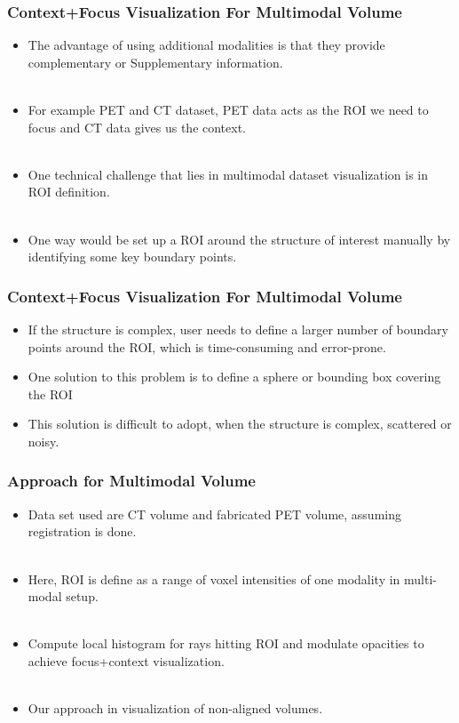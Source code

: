 \documentclass{beamer}
\begin{document}


\begin{frame}
\frametitle{Context+Focus Visualization For Multimodal Volume}
\begin{itemize}
\item The advantage of using additional modalities is that they provide complementary or Supplementary information. \\ $ $
\item For example PET and CT dataset, PET data acts as the ROI we need to focus and CT data gives us the context. \\ $ $
\item One technical challenge that lies in multimodal dataset visualization is in ROI definition.  \\ $ $
\item One way would be set up a ROI around the structure of interest manually by identifying some key boundary points.
\end{itemize}
\end{frame}



\begin{frame}
\frametitle{Context+Focus Visualization For Multimodal Volume}
\begin{itemize}
 
\item If the structure is complex, user needs to define a larger number of boundary points around the ROI, which is time-consuming and error-prone. 
\item One solution to this problem is to define a sphere or bounding box covering the ROI
\item This solution is difficult to adopt, when the structure is complex, scattered or noisy.
\end{itemize}
\end{frame}


\begin{frame}
\frametitle{Approach for Multimodal Volume}
\begin{itemize}
\item Data set used are CT volume and fabricated PET volume, assuming registration is done. \\ $ $
\item Here, ROI is define as a range of voxel intensities of one modality in multi-modal setup. \\ $ $
\item Compute local histogram for rays hitting ROI and modulate opacities to achieve focus+context visualization. \\ $ $
\item Our approach in visualization of non-aligned volumes.
\end{itemize}
\end{frame}
\end{document}
